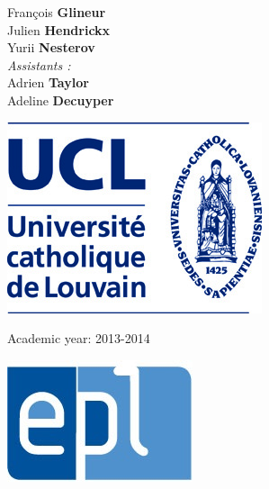 \begin{titlepage}
\begin{minipage}{0.5\textwidth}
\begin{flushright}
François \textbf{Glineur}\\
Julien \textbf{Hendrickx}\\
Yurii \textbf{Nesterov}\\
\emph{Assistants :}\\
Adrien \textbf{Taylor}\\
Adeline \textbf{Decuyper}
\end{flushright}
\end{minipage}
\vfill
\begin{center}
\begin{minipage}{0.25\textwidth}
\begin{flushleft}
\includegraphics[scale=0.25]{Couverture/ucl-logo.jpg}
\end{flushleft}
\end{minipage}
\begin{minipage}{0.48\textwidth}
\begin{center}
\Large{Academic year: 2013-2014}
\end{center}
\end{minipage}
\begin{minipage}{0.25\textwidth}
\begin{flushright}
\includegraphics[scale=0.5]{Couverture/epl-logo.jpg}
\end{flushright}
\end{minipage}
\end{center}
\end{titlepage}
\newpage